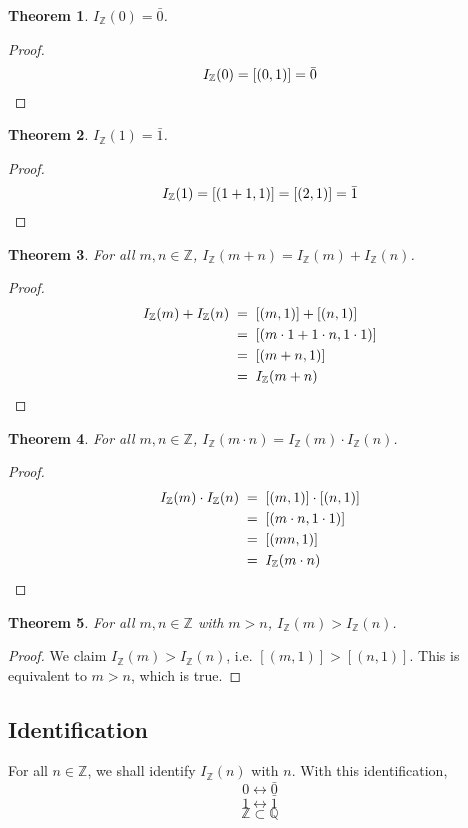 \documentclass[10pt]{article}
\newtheorem{theorem}{Theorem}[section]
\theoremstyle{definition}
\theoremstyle{remark}
\newcommand{\Z}{\mathbb{Z}}
\newcommand{\Q}{\mathbb{Q}}
\newcommand{\IdZ}{I_{\Z}}
\begin{document}
        \begin{theorem}
                $\IdZ(0) = \bar{0}$.
        \end{theorem}
        \begin{proof}
                \[\IdZ(0) = [(0, 1)] = \bar{0} \qedhere\]
        \end{proof}

        \begin{theorem}
                $\IdZ(1) = \bar{1}$.
        \end{theorem}
        \begin{proof}
                \[\IdZ(1) = [(1 + 1, 1)] = [(2, 1)] = \bar{1} \qedhere\]
        \end{proof}

        \begin{theorem}
                For all $m, n \in \Z$, $\IdZ(m + n) = \IdZ(m) + \IdZ(n)$.
        \end{theorem}
        \begin{proof}
                \begin{align*}
                        \IdZ(m) + \IdZ(n) \;&=\; [(m, 1)] + [(n, 1)] \\
                                \;&=\; [(m\cdot 1 + 1\cdot n, 1\cdot 1)] \\
                                \;&=\; [(m + n, 1)] \\
                                \;&=\; \IdZ(m + n) \qedhere
                \end{align*}
        \end{proof}

        \begin{theorem}
                For all $m, n \in \Z$, $\IdZ(m \cdot n) = \IdZ(m) \cdot \IdZ(n)$.
        \end{theorem}
        \begin{proof}
                \begin{align*}
                        \IdZ(m) \cdot \IdZ(n) \;&=\; [(m, 1)] \cdot [(n, 1)] \\
                                \;&=\; [(m\cdot n, 1\cdot 1)] \\
                                \;&=\; [(mn, 1)] \\
                                \;&=\; \IdZ(m \cdot n) \qedhere
                \end{align*}
        \end{proof}

        \begin{theorem}
                For all $m, n \in \Z$ with $m > n$, $\IdZ(m) > \IdZ(n)$.
        \end{theorem}
        \begin{proof}
                We claim $\IdZ(m) > \IdZ(n)$, i.e. $[(m, 1)] > [(n, 1)]$.
                This is equivalent to $m > n$, which is true.
        \end{proof}
        
        \subsection*{Identification}
        For all $n \in \Z$, we shall identify $\IdZ(n)$ with $n$.
        With this identification,
        \[0 \leftrightarrow \bar{0}\]
        \[1 \leftrightarrow \bar{1}\]
        \[\Z \subset \Q\]
\end{document}
